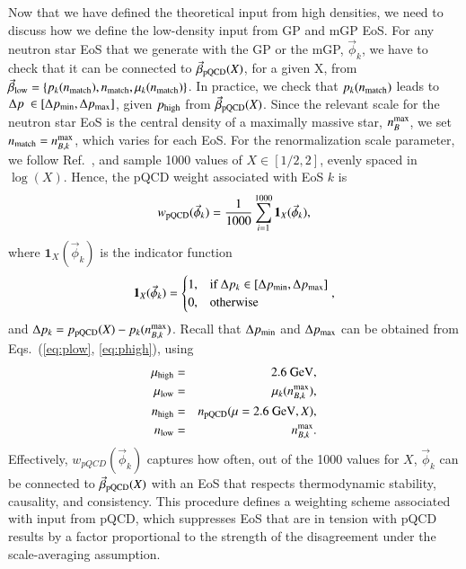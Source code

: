 \documentclass[aps,prd,nofootinbib,tightenlines,notitlepage,floatfix,superscriptaddress,showkeys,twocolumn]{revtex4-1}
\begin{document}
Now that we have defined the theoretical input from high densities, we need to discuss how we define the low-density input from GP and mGP EoS. For any neutron star EoS that we generate with the GP or the mGP, $\vec{\phi}_k$, we have to check that it can be connected to $\vec{\beta}_{\rm pQCD}(X)$, for a given X, from $\vec{\beta}_{\rm low} = \{p_k(n_{\rm match}), n_{\rm match}, \mu_k(n_{\rm match}) \}$. In practice, we check that $p_k(n_{\rm match})$ leads to $\Delta p \ \in [\Delta p_{\rm min}, \Delta p_{\rm max}]$, given $p_{\rm high}$ from $\vec{\beta}_{\rm pQCD}(X)$. Since the relevant scale for the neutron star EoS is the central density of a maximally massive star, $n_B^{\rm max}$, we set $n_{\rm match} = n_{B,k}^{\rm max}$, which varies for each EoS. For the renormalization scale parameter, we follow Ref.~\cite{Gorda:2022jvk}, and sample 1000 values of $X \in [1/2,2]$, evenly spaced in $\log(X)$. Hence, the pQCD weight associated with EoS $k$ is
\begin{equation}\label{eq:w_pQCD_def}
    w_{\rm pQCD}(\vec{\phi}_k) = \dfrac{1}{1000}\sum^{1000}_{i= 1} \mathbf{1}_{X}(\vec{\phi}_k),
\end{equation}
where $\mathbf{1}_{X}(\vec{\phi}_k)$ is the indicator function
\begin{equation}
    \mathbf{1}_{X}(\vec{\phi}_k) = \begin{cases}
    1,& \text{if } \Delta p_k \in [\Delta p_{\rm min}, \Delta p_{\rm max}]\\
    0,              & \text{otherwise}
\end{cases},
\end{equation}
and $\Delta p_k = p_{\rm pQCD}(X) - p_k(n_{B,k}^{\rm max})$. Recall that $\Delta p_{\rm min}$ and $\Delta p_{\rm max}$ can be obtained from Eqs.~(\ref{eq:plow}, \ref{eq:phigh}), using 
\begin{eqnarray*}
    \mu_{\rm high}  & = & 2.6 \textrm{ GeV}, \\
    \mu_{\rm low}  &=  & \mu_k(n_{B,k}^{\rm max}),\\
    n_{\rm high}  &=  & n_{\rm pQCD}(\mu = 2.6 \textrm{ GeV},X), \\
    n_{\rm low}  &= & n_{B,k}^{\rm max}.
\end{eqnarray*}
Effectively, $w_{pQCD}(\vec{\phi}_k)$ captures how often, out of the 1000 values for $X$, $\vec{\phi}_k$ can be connected to $\vec{\beta}_{\rm pQCD}(X)$ with an EoS that respects thermodynamic stability, causality, and consistency. This procedure defines a weighting scheme associated with input from pQCD, which suppresses EoS that are in tension with pQCD results by a factor proportional to the strength of the disagreement under the scale-averaging assumption. 
\end{document}
